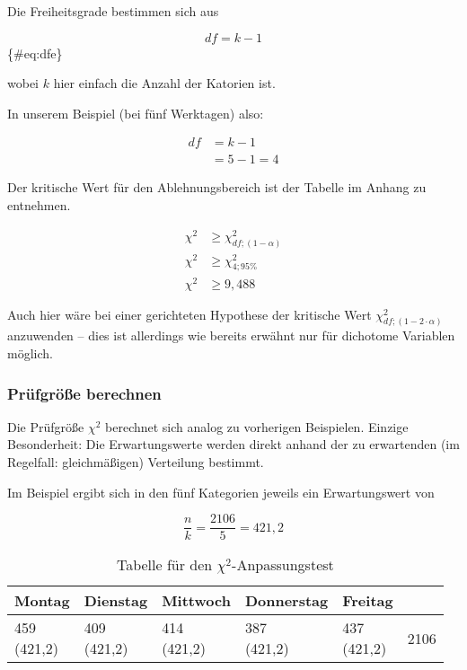 \documentclass[
  ngerman,
]{article}
\begin{document}
Die Freiheitsgrade bestimmen sich aus

\[\mathit{df}=k-1\]\{\#eq:dfe\}

wobei \(k\) hier einfach die Anzahl der Katorien ist.

In unserem Beispiel (bei fünf Werktagen) also:

\[\begin{aligned}
\mathit{df}&=k-1\\
&=5-1=4
\end{aligned}\]

Der kritische Wert für den Ablehnungsbereich ist der Tabelle im Anhang zu entnehmen.

\[\begin{aligned}
\chi^2 &\geq \chi^2_{\mathit{df};(1-\alpha)}\\
\chi^2 &\geq \chi^2_{4;95\%}\\
\chi^2 &\geq 9,488
\end{aligned}\]

Auch hier wäre bei einer gerichteten Hypothese der kritische Wert \(\chi^2_{\mathit{df};(1-2\cdot \alpha)}\) anzuwenden -- dies ist allerdings wie bereits erwähnt nur für dichotome Variablen möglich.

\hypertarget{pruxfcfgruxf6uxdfe-berechnen-5}{%
\subsubsection{Prüfgröße berechnen}\label{pruxfcfgruxf6uxdfe-berechnen-5}}

Die Prüfgröße \(\chi^2\) berechnet sich analog zu vorherigen Beispielen. Einzige Besonderheit: Die Erwartungswerte werden direkt anhand der zu erwartenden (im Regelfall: gleichmäßigen) Verteilung bestimmt.

Im Beispiel ergibt sich in den fünf Kategorien jeweils ein Erwartungswert von

\[\frac{n}{k}=\frac{2106}{5}=421,2\]

\begin{table}

\caption{\label{tab:xtlate}Tabelle für den $\chi^2$-Anpassungstest}
\centering
\begin{tabular}[t]{llll>{}l|r}
\toprule
Montag & Dienstag & Mittwoch & Donnerstag & Freitag &  \\
\midrule
\makecell[tr]{459\\(421,2)\\\color{goethe_blue}{3,392}} & \makecell[tr]{409\\(421,2)\\\color{goethe_blue}{0,353}} & \makecell[tr]{414\\(421,2)\\\color{goethe_blue}{0,123}} & \makecell[tr]{387\\(421,2)\\\color{goethe_blue}{2,777}} & \makecell[tr]{437\\(421,2)\\\color{goethe_blue}{0,593}} & 2106\\
\bottomrule
\end{tabular}
\end{table}
\end{document}
